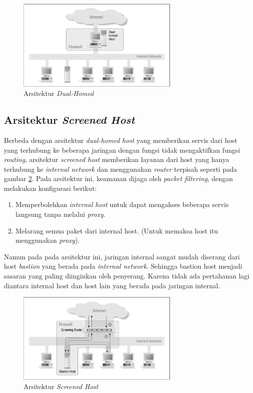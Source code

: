 \begin{figure}[H]
	\centering
	\includegraphics[width=300px]{resources/dual_homed.png}
	\caption{Arsitektur \textit{Dual-Homed}}
	\label{fig:dual_homed}
\end{figure}

\subsection{Arsitektur \textit{Screened Host}}

Berbeda dengan arsitektur \textit{dual-homed host} yang memberikan servis dari host yang terhubung ke beberapa jaringan dengan fungsi tidak mengaktifkan fungsi \textit{routing}, arsitektur \textit{screened host} memberikan layanan dari host yang hanya terhubung ke \textit{internal network} dan menggunakan \textit{router} terpisah seperti pada  gambar \ref{fig:screened_host}. Pada arsitektur ini, keamanan dijaga oleh \textit{packet filtering}, dengan melakukan konfigurasi berikut:

\begin{enumerate}
\item Memperbolehkan \textit{internal host} untuk dapat mengakses beberapa servis langsung tanpa melalui \textit{proxy}.
\item Melarang semua paket dari internal host. (Untuk memaksa host itu menggunakan \textit{proxy}).
\end{enumerate}

Namun pada pada arsitektur ini, jaringan internal sangat mudah diserang dari host \textit{bastion} yang berada pada \textit{internal network}. Sehingga bastion host menjadi sasaran yang paling diinginkan oleh penyerang. Karena tidak ada pertahanan lagi diantara internal host dan host lain yang berada pada jaringan internal.

\begin{figure}[H]
	\centering
	\includegraphics[width=300px]{resources/screened_host.png}
	\caption{Arsitektur \textit{Screened Host}}
	\label{fig:screened_host}
\end{figure}


